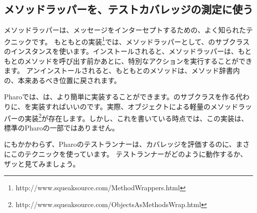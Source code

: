 \documentclass[a4paper,10pt,twoside]{book}
\begin{document}
\subsection{メソッドラッパーを、テストカバレッジの測定に使う}

メソッドラッパーは、メッセージをインターセプトするための、よく知られたテクニックです\cite{Bran98a}。
もともとの実装\footnote{http://www.squeaksource.com/MethodWrappers.html}では、メソッドラッパーとして、のサブクラスのインスタンスを使います。インストールされると、メソッドラッパーは、もともとのメソッドを呼び出す前かあとに、特別なアクションを実行することができます。
アンインストールされると、もともとのメソッドは、メソッド辞書内の、本来あるべき位置に戻されます。

Pharoでは、は、より簡単に実装することができます。のサブクラスを作る代わりに、を実装すればいいのです。実際、オブジェクトによる軽量のメソッドラッパーの実装\footnote{http://www.squeaksource.com/ObjectsAsMethodsWrap.html}が存在します。しかし、これを書いている時点では、この実装は、標準のPharoの一部ではありません。

にもかかわらず、Pharoのテストランナーは、カバレッジを評価するのに、まさにこのテクニックを使っています。
テストランナーがどのように動作するか、ザッと見てみましょう。
\end{document}

